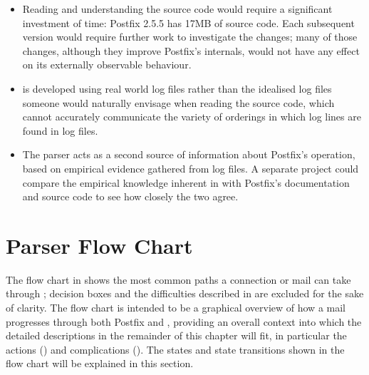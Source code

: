 \begin{itemize}

    \item Reading and understanding the source code would require a
        significant investment of time: Postfix 2.5.5 has 17MB of source
        code.  Each subsequent version would require further work to
        investigate the changes; many of those changes, although they
        improve Postfix's internals, would not have any effect on its
        externally observable behaviour.

    \item \parsername{} is developed using real world log files rather than
        the idealised log files someone would naturally envisage when
        reading the source code, which cannot accurately communicate the
        variety of orderings in which log lines are found in log files.

    \item The parser acts as a second source of information about Postfix's
        operation, based on empirical evidence gathered from log files.  A
        separate project could compare the empirical knowledge inherent in
        \parsername{} with Postfix's documentation and source code to see
        how closely the two agree.

\end{itemize}



\section{Parser Flow Chart}

\label{flow chart}

The flow chart in  shows the most common paths
a connection or mail can take through \parsername{}; decision boxes and the
difficulties described in  are excluded for the
sake of clarity.  The flow chart is intended to be a graphical overview of
how a mail progresses through both Postfix and \parsername{}, providing an
overall context into which the detailed descriptions in the remainder of
this chapter will fit, in particular the actions () and complications ().  The
states and state transitions shown in the flow chart will be explained
in this section.


